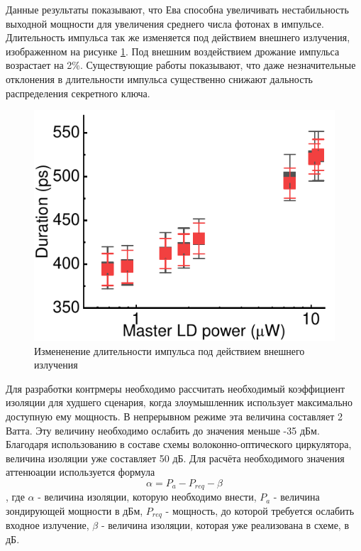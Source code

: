 Данные результаты показывают, что Ева способна увеличивать нестабильность выходной мощности для увеличения среднего числа фотонах в импульсе. Длительность импульса так же изменяется под действием внешнего излучения, изображенном на рисунке \ref{fig:duration ref}. Под внешним воздействием дрожание импульса возрастает на 2\%.  Существующие работы показывают, что даже незначительные отклонения в длительности импульса существенно снижают дальность распределения секретного ключа. 
\begin{figure}
    \centering
    \includegraphics{images/duration_change.pdf}
    \caption{Измененение длительности импульса под действием внешнего излучения}
    \label{fig:duration ref}
\end{figure}
\newline Для разработки контрмеры необходимо рассчитать необходимый коэффициент изоляции для худшего сценария, когда злоумышленник использует максимально доступную ему мощность. В непрерывном режиме эта величина составляет 2 Ватта. Эту величину необходимо ослабить до значения меньше -35 дБм. Благодаря использованию в составе схемы волоконно-оптического циркулятора, величина изоляции уже составляет 50 дБ.  Для расчёта необходимого значения аттенюации используется формула
\begin{equation}
\label{eq:isolation}
    \alpha = P_a - P_{req} - \beta
\end{equation}, где $\alpha$ - величина изоляции, которую необходимо внести, $P_a$ - величина зондирующей мощности в дБм, $P_{req}$ - мощность, до которой требуется ослабить входное излучение, $\beta$ - величина изоляции, которая уже реализована в схеме, в дБ. 
